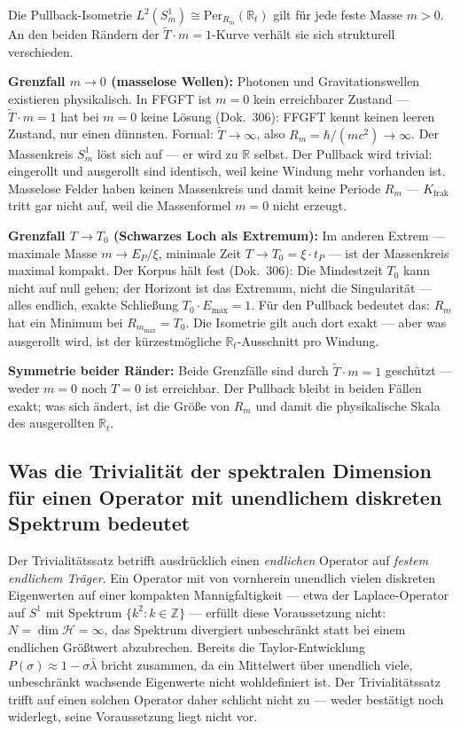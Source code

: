 Die Pullback-Isometrie
$L^2(S^1_m)\cong\mathrm{Per}_{R_m}(\mathbb{R}_t)$ gilt für jede
feste Masse $m>0$. An den beiden Rändern der $\tilde{T}\cdot m=1$-Kurve
verhält sie sich strukturell verschieden.

\textbf{Grenzfall $m\to 0$ (masselose Wellen):}
Photonen und Gravitationswellen existieren physikalisch. In FFGFT
ist $m=0$ kein erreichbarer Zustand --- $\tilde{T}\cdot m=1$ hat
bei $m=0$ keine Lösung (Dok.~306): FFGFT kennt keinen leeren
Zustand, nur einen dünnsten. Formal: $\tilde{T}\to\infty$, also
$R_m=\hbar/(mc^2)\to\infty$. Der Massenkreis $S^1_m$ löst sich
auf --- er wird zu $\mathbb{R}$ selbst. Der Pullback wird trivial:
eingerollt und ausgerollt sind identisch, weil keine Windung
mehr vorhanden ist. Masselose Felder haben keinen Massenkreis
und damit keine Periode $R_m$ --- $K_\text{frak}$ tritt gar nicht
auf, weil die Massenformel $m=0$ nicht erzeugt.

\textbf{Grenzfall $T\to T_0$ (Schwarzes Loch als Extremum):}
Im anderen Extrem --- maximale Masse $m\to E_P/\xi$, minimale
Zeit $T\to T_0=\xi\cdot t_P$ --- ist der Massenkreis maximal
kompakt. Der Korpus hält fest (Dok.~306): Die Mindestzeit
$T_0$ kann nicht auf null gehen; der Horizont ist das Extremum,
nicht die Singularität --- alles endlich, exakte Schließung
$T_0\cdot E_\text{max}=1$. Für den Pullback bedeutet das:
$R_m$ hat ein Minimum bei $R_{m_\text{max}}=T_0$. Die Isometrie
gilt auch dort exakt --- aber was ausgerollt wird, ist der
kürzestmögliche $\mathbb{R}_t$-Ausschnitt pro Windung.

\textbf{Symmetrie beider Ränder:}
Beide Grenzfälle sind durch $\tilde{T}\cdot m=1$ geschützt ---
weder $m=0$ noch $T=0$ ist erreichbar. Der Pullback bleibt in
beiden Fällen exakt; was sich ändert, ist die Größe von $R_m$
und damit die physikalische Skala des ausgerollten $\mathbb{R}_t$.

\subsection{Was die Trivialität der spektralen Dimension für einen Operator mit unendlichem diskreten Spektrum bedeutet}

Der Trivialitätssatz betrifft ausdrücklich einen \emph{endlichen} Operator
auf \emph{festem endlichem Träger}. Ein Operator mit von vornherein
unendlich vielen diskreten Eigenwerten auf einer kompakten Mannigfaltigkeit
— etwa der Laplace-Operator auf $S^1$ mit Spektrum $\{k^2:k\in\mathbb{Z}\}$
— erfüllt diese Voraussetzung nicht: $N=\dim\mathcal H=\infty$, das
Spektrum divergiert unbeschränkt statt bei einem endlichen Größtwert
abzubrechen. Bereits die Taylor-Entwicklung $P(\sigma)\approx1-\sigma\bar\lambda$
bricht zusammen, da ein Mittelwert über unendlich viele, unbeschränkt
wachsende Eigenwerte nicht wohldefiniert ist. Der Trivialitätssatz trifft
auf einen solchen Operator daher schlicht nicht zu — weder bestätigt noch
widerlegt, seine Voraussetzung liegt nicht vor.

